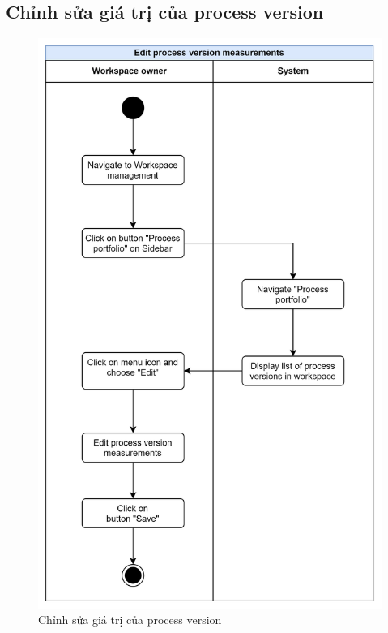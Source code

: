 \subsection{Chỉnh sửa giá trị của process version}
\begin{figure}[H]
    \centering
    \includegraphics[width=0.8\linewidth]{Content/Phân tích và thiết kế hệ thống/documents/Sơ đồ hoạt động/images/editProcessVersionMeasurements.png}
    \vspace{0.5cm}
    \caption{Chỉnh sửa giá trị của process version}
    \label{fig:Chỉnh sửa giá trị của process version}
\end{figure}